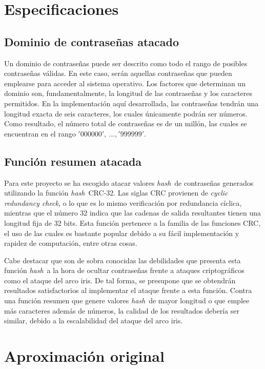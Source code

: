 \documentclass[12pt,spanish,listoffigures,listoftables,listofalgorithms]{tfgetsinf}
\newcommand{\hash}{\textit{hash}}
\begin{document}
\section{Especificaciones}

\subsection{Dominio de contraseñas atacado}

Un dominio de contraseñas puede ser descrito como todo el rango de posibles contraseñas válidas. En este caso, serán aquellas contraseñas que pueden emplearse para acceder al sistema operativo. Los factores que determinan un dominio son, fundamentalmente, la longitud de las contraseñas y los caracteres permitidos. En la implementación aquí desarrollada, las contraseñas tendrán una longitud exacta de seis caracteres, los cuales únicamente podrán ser números. Como resultado, el número total de contraseñas es de un millón, las cuales se encuentran en el rango $'000000',~\dots, '999999'$.


\subsection{Función resumen atacada} \label{crc32}

Para este proyecto se ha escogido atacar valores \hash~de contraseñas generados utilizando la función \hash~CRC-32. Las siglas CRC provienen de \textit{cyclic redundancy check}, o lo que es lo mismo verificación por redundancia cíclica, mientras que el número 32 indica que las cadenas de salida resultantes tienen una longitud fija de 32 bits. Esta función pertenece a la familia de las funciones CRC, el uso de las cuales es bastante popular debido a su fácil implementación y rapidez de computación, entre otras cosas.

Cabe destacar que son de sobra conocidas las debilidades que presenta esta función \hash~a la hora de ocultar contraseñas frente a ataques criptográficos como el ataque del arco iris. De tal forma, se presupone que se obtendrán resultados satisfactorios al implementar el ataque frente a esta función. Contra una función resumen que genere valores \hash~de mayor longitud o que emplee más caracteres además de números, la calidad de los resultados debería ser similar, debido a la escalabilidad del ataque del arco iris.

\section{Aproximación original}
\end{document}
